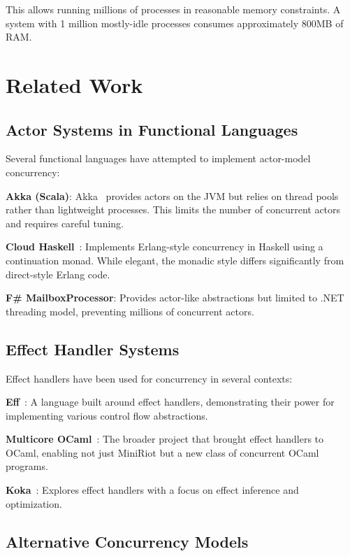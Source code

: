 \documentclass[sigplan,screen]{acmart}
\begin{document}
This allows running millions of processes in reasonable memory constraints. A system with 1 million mostly-idle processes consumes approximately 800MB of RAM.

\section{Related Work}

\subsection{Actor Systems in Functional Languages}

Several functional languages have attempted to implement actor-model concurrency:

\textbf{Akka (Scala)}: Akka~\cite{akka} provides actors on the JVM but relies on thread pools rather than lightweight processes. This limits the number of concurrent actors and requires careful tuning.

\textbf{Cloud Haskell}~\cite{epstein2011}: Implements Erlang-style concurrency in Haskell using a continuation monad. While elegant, the monadic style differs significantly from direct-style Erlang code.

\textbf{F\# MailboxProcessor}: Provides actor-like abstractions but limited to .NET threading model, preventing millions of concurrent actors.

\subsection{Effect Handler Systems}

Effect handlers have been used for concurrency in several contexts:

\textbf{Eff}~\cite{eff}: A language built around effect handlers, demonstrating their power for implementing various control flow abstractions.

\textbf{Multicore OCaml}~\cite{multicoreocaml}: The broader project that brought effect handlers to OCaml, enabling not just MiniRiot but a new class of concurrent OCaml programs.

\textbf{Koka}~\cite{koka}: Explores effect handlers with a focus on effect inference and optimization.

\subsection{Alternative Concurrency Models}
\end{document}
